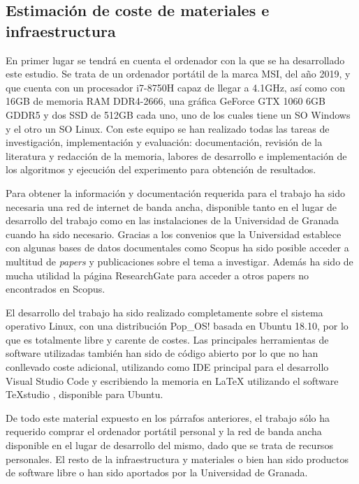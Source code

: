 \subsection{Estimación de coste de materiales e infraestructura}

En primer lugar se tendrá en cuenta el ordenador con la que se ha desarrollado este estudio. Se trata de un ordenador portátil de la marca MSI, del año 2019, y que cuenta con un procesador i7-8750H capaz de llegar a 4.1GHz, así como con 16GB de memoria RAM DDR4-2666, una gráfica GeForce GTX 1060 6GB GDDR5 y dos SSD de 512GB cada uno, uno de los cuales tiene un SO Windows y el otro un SO Linux. Con este equipo se han realizado todas las tareas de investigación, implementación y evaluación: documentación, revisión de la literatura y redacción de la memoria, labores de desarrollo e implementación de los algoritmos y ejecución del experimento para obtención de resultados.

Para obtener la información y documentación requerida para el trabajo ha sido necesaria una red de internet de banda ancha, disponible tanto en el lugar de desarrollo del trabajo como en las instalaciones de la Universidad de Granada cuando ha sido necesario. Gracias a los convenios que la Universidad establece con algunas bases de datos documentales como Scopus \cite{scopus-website} ha sido posible acceder a multitud de \textit{papers} y publicaciones sobre el tema a investigar. Además ha sido de mucha utilidad la página ResearchGate \cite{research-gate-website} para acceder a otros papers no encontrados en Scopus.

El desarrollo del trabajo ha sido realizado completamente sobre el sistema operativo Linux, con una distribución Pop\_OS! \cite{pop-os} basada en Ubuntu 18.10, por lo que es totalmente libre y carente de costes. Las principales herramientas de software utilizadas también han sido de código abierto por lo que no han conllevado coste adicional, utilizando como IDE principal para el desarrollo Visual Studio Code \cite{vscode-github} y escribiendo la memoria en LaTeX utilizando el software TeXstudio \cite{texstudio}, disponible para Ubuntu.

De todo este material expuesto en los párrafos anteriores, el trabajo sólo ha requerido comprar el ordenador portátil personal y la red de banda ancha disponible en el lugar de desarrollo del mismo, dado que se trata de recursos personales. El resto de la infraestructura y materiales o bien han sido productos de software libre o han sido aportados por la Universidad de Granada.

